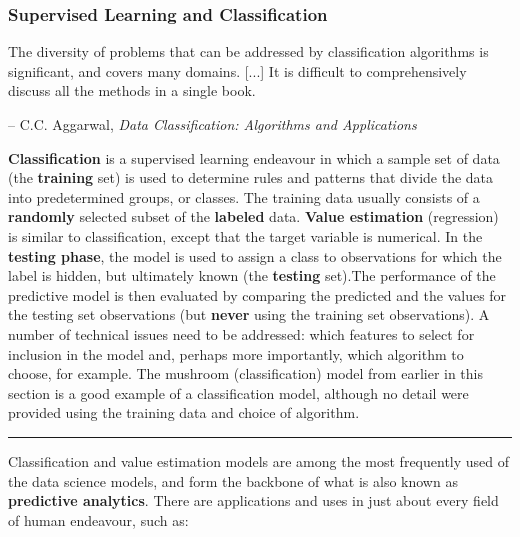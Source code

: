\subsubsection{Supervised Learning and Classification}
\begin{tcolorbox}[title=An Embarrassment of Riches]
The diversity of problems that can be addressed by classification algorithms is significant, and covers many domains. [...] It is difficult to comprehensively discuss all the methods in a single book. \\[-0.6cm]
\begin{flushright}
-- C.C. Aggarwal, \textit{Data Classification: Algorithms and Applications}
\end{flushright}
\end{tcolorbox}
\noindent \textbf{Classification} is a supervised learning endeavour in which  a sample set of data (the \textbf{training} set) is used to determine rules and patterns that divide the data into predetermined groups, or classes. The training data usually consists of a \textbf{randomly} selected subset of the \textbf{labeled} data. \textbf{Value estimation} (regression) is similar to classification, except that the target variable is numerical. In the \textbf{testing phase}, the model is used to assign a class to observations for which the label is hidden, but ultimately known (the \textbf{testing} set).\newl  The performance of the predictive model is then evaluated by comparing the predicted and the values for the testing set observations (but \textbf{never} using the training set observations). A number of technical issues need to be addressed: which features to select for inclusion in the model and, perhaps more importantly, which algorithm to choose, for example. The mushroom (classification) model from earlier in this section is a good example of a classification model, although no detail were provided using the training data and choice of algorithm. 
\begin{center}
    \rule{0.5\textwidth}{.4pt}
\end{center} 
Classification and value estimation models are among the most frequently used of the data science models, and form the backbone of what is also known as \textbf{predictive analytics}. There are applications and uses in just about every field of human endeavour, such as: 

